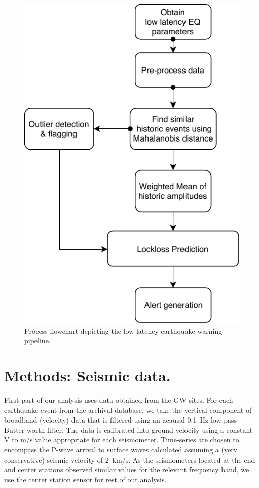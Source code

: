 \documentclass[reprint, prl, aps, showpacs]{revtex4-1}
\begin{document}
 \begin{figure}[!htb]
 \includegraphics[scale=0.7]{./plots/SEISMON_flowchart.pdf}
 \caption{Process flowchart depicting the low latency earthquake warning pipeline.}
 \label{fig:flowchart}
\end{figure}   

\section{Methods: Seismic data.}\label{sec:data}

First part of our analysis uses data obtained from the GW sites. For each earthquake event from the archival database, we take the vertical component of broadband (velocity) data that is filtered using an acausal 0.1\, Hz low-pass Butter-worth filter. The data is calibrated into ground velocity using a constant V to m/s value appropriate for each seismometer. Time-series are chosen to encompass the P-wave arrival to surface waves calculated assuming a (very conservative) seismic velocity of 2\, km/s. As the seismometers located at the end and center stations observed similar values for the relevant frequency band, we use the center station sensor for rest of our analysis.
\end{document}
